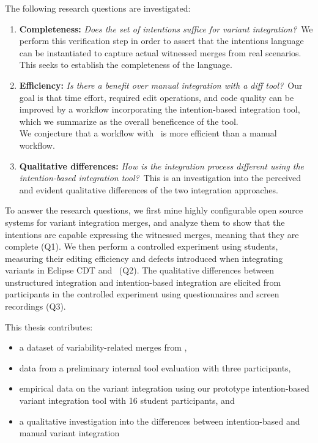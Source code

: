 The following research questions are investigated:

\newcommand{\RQA}{Does the set of intentions suffice for variant integration?}
\newcommand{\RQB}{Is there a benefit over manual integration with a diff tool?}
\newcommand{\RQC}{How is the integration process different using the intention-based integration tool?}

\begin{enumerate}[label={Q\arabic*}]

        \item\label{rq-a} \textbf{Completeness:} \textit{\RQA}~We perform this verification step in order to assert that the intentions language can be instantiated to capture actual witnessed merges from real scenarios. This seeks to establish the completeness of the language.

        \item\label{rq-b} \textbf{Efficiency:} \textit{\RQB}~Our goal is that time effort, required edit operations, and code quality can be improved by a workflow incorporating the intention-based integration tool, which we summarize as the overall beneficence of the tool.\\
        We conjecture that a workflow with \tooln~is more efficient than a manual workflow.
        
        \item\label{rq-c} \textbf{Qualitative differences:} \textit{\RQC}~This is an investigation into the perceived and evident qualitative differences of the two integration approaches.
        
\end{enumerate}

To answer the research questions, we first mine highly configurable open source systems for variant integration merges, and analyze them to show that the intentions are capable expressing the witnessed merges, meaning that they are complete (Q1). We then perform a controlled experiment using students, measuring their editing efficiency and defects introduced when integrating variants in Eclipse CDT and \tooln~(Q2). The qualitative differences between unstructured integration and intention-based integration are elicited from participants in the controlled experiment using questionnaires and screen recordings (Q3).

This thesis contributes:
\begin{itemize}
    \item a dataset of variability-related merges from \marlin,
    \item data from a preliminary internal tool evaluation with three participants,
    \item empirical data on the variant integration using our prototype intention-based variant integration tool with 16 student participants, and
    \item a qualitative investigation into the differences between intention-based and manual variant integration
\end{itemize}

